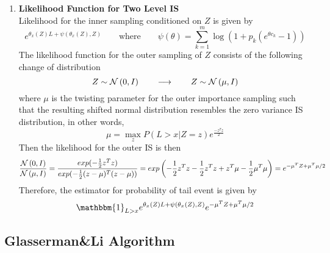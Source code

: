 \documentclass[11pt]{article}
\begin{document}
\newpage 

\begin{enumerate}
    \item \textbf{Likelihood Function for Two Level IS} \\
    Likelihood for the inner sampling conditioned on $Z$ is given by 
    \[
        e^{\theta_x(Z)L + \psi(\theta_x(Z), Z)}
        \qquad \text{where} \qquad 
        \psi(\theta) = \sum_{k=1}^m \log (1 + p_k (e^{\theta c_k} - 1))
    \]
    The likelihood function for the outer sampling of $Z$ consists of the following change of distribution
    \[
        Z \sim \mathcal{N}\left(0, I\right)    
        \qquad \longrightarrow \qquad 
        Z \sim \mathcal{N}\left(\mu, I\right)
    \]
    where $\mu$ is the twisting parameter for the outer importance sampling such that the resulting shifted normal distribution resembles the zero variance IS distribution, in other words,
    \[
        \mu = \max_z P(L>x | Z=z) e^{\frac{-z^T z}{2}}
    \]
    Then the likelihood for the outer IS is then 
    \[
        \frac{\mathcal{N}\left(0, I\right)}{\mathcal{N}\left(\mu, I\right)}
        = \frac{exp(-\frac{1}{2} z^T z)}{exp(-\frac{1}{2} (z-\mu)^T (z-\mu))}
        = exp
        \left(
            -\frac{1}{2} z^T z - \frac{1}{2} z^T z + z^T \mu - \frac{1}{2} \mu^T \mu
        \right)
        = e^{ -\mu^T Z + \mu^T \mu /2 }
    \]
    Therefore, the estimator for probability of tail event is given by 
    \[
        \mathbbm{1}_{L>x} e^{\theta_x(Z)L + \psi(\theta_x(Z), Z)} e^{ -\mu^T Z + \mu^T \mu /2 }
    \]
\end{enumerate}


\newpage 

\subsection*{Glasserman\&Li Algorithm}
\end{document}
